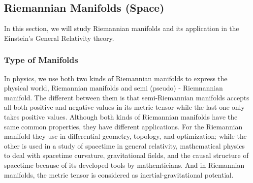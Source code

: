 \documentclass[11pt,a4paper]{article}
\begin{document}
	\subsection{Riemannian Manifolds (Space)}
	In this section, we will study Riemannian manifolds and its application in the Einstein's General Relativity theory.
	\subsubsection{Type of Manifolds}
	In physics, we use both two kinds of Riemannian manifolds to express the physical world,  Riemannian manifolds and semi (pseudo) - Riemnannian manifold. The different between them is that semi-Riemannian manifolds accepts all both positive and negative values in its metric tensor while the last one only takes positive values.  Although both kinds of Riemannian manifolds have the same common properties, they have different applications. For the Riemannian manifold they use in differential geometry, topology, and optimization; while the other is used in a study of spacetime in general relativity, mathematical physics to deal with spacetime curvature, gravitational fields, and the causal structure of spacetime because of its developed tools by mathemticians. And in Riemannian manifolds, the metric tensor is considered as inertial-gravitational potential.
\end{document}
